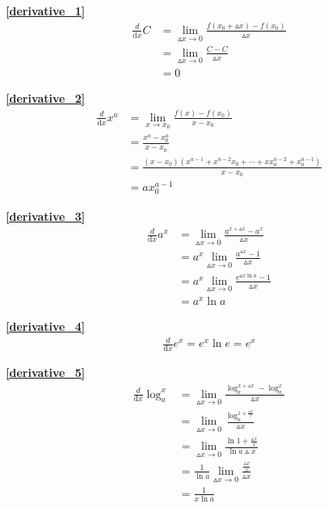 \textbf{\large \ref{derivative_1}}
\begin{displaymath}
    \begin{split}
        \frac{d}{\mathrm{d}{x}}C&=\lim\limits_{\vartriangle x\to 0}\frac{f(x_0+\vartriangle x)-f(x_0)}{\vartriangle x}\\
        &=\lim\limits_{\vartriangle x\to 0} \frac{C-C}{\vartriangle x}\\
        &=0
    \end{split}
\end{displaymath}

\textbf{\large \ref{derivative_2}}
\begin{displaymath}
    \begin{split}
        \frac{d}{\mathrm{d}{x}}x^a&=\lim\limits_{x\to x_0}\frac{f(x)-f(x_0)}{x-x_0}\\
        &=\frac{x^a-x_0^a}{x-x_0}\\
        &=\frac{(x-x_0)\left(x^{a-1}+x^{a-2}x_0+\cdots+xx_0^{a-2}+x_0^{a-1}\right)}{x-x_0}\\
        &=ax_0^{a-1}
    \end{split}
\end{displaymath}

\textbf{\large \ref{derivative_3}}
\begin{displaymath}
    \begin{split}
        \frac{d}{\mathrm{d}{x}}a^x&=\lim\limits_{\vartriangle x\to 0}\frac{a^{x+\vartriangle x}-a^x}{\vartriangle x}\\
        &=a^x\lim\limits_{\vartriangle x\to 0}\frac{a^{\vartriangle x}-1}{\vartriangle x}\\
        &=a^x\lim\limits_{\vartriangle x\to 0}\frac{e^{\vartriangle x \ln a}-1}{\vartriangle x}\\
        &=a^x\ln a
    \end{split}
\end{displaymath}

\textbf{\large \ref{derivative_4}}
\begin{displaymath}
    \begin{split}
        \frac{d}{\mathrm{d}{x}}e^x=e^x\ln e=e^x
    \end{split}
\end{displaymath}

\textbf{\large \ref{derivative_5}}
\begin{displaymath}
    \begin{split}
        \frac{d}{\mathrm{d}{x}}\log_a^x&=\lim\limits_{\vartriangle x\to 0}\frac{\log_a^{x+\vartriangle x}-\log_a^x}{\vartriangle x}\\
        &=\lim\limits_{\vartriangle x\to 0}\frac{\log_a^{1+\frac{\vartriangle x}{x}}}{\vartriangle x}\\
        &=\lim\limits_{\vartriangle x\to 0}\frac{\ln{1+\frac{\vartriangle x}{x}}}{\ln a\vartriangle x}\\
        &=\frac{1}{\ln a}\lim\limits_{\vartriangle x\to 0}\frac{\frac{\vartriangle x}{x}}{\vartriangle x}\\
        &=\frac{1}{x\ln a}
    \end{split}
\end{displaymath}

